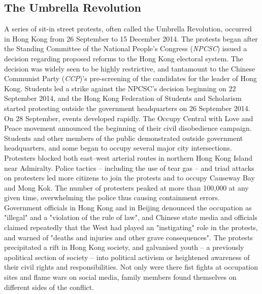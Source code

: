 \documentclass[10pt,conference,a4paper]{IEEEtran}%
\begin{document}
\subsection{The Umbrella Revolution}
A series of sit-in street protests, often called the Umbrella Revolution, occurred in Hong Kong from 26 September to 15 December 2014. The protests began after the Standing Committee of the National People's Congress (\emph{NPCSC}) issued a decision regarding proposed reforms to the Hong Kong electoral system. The decision was widely seen to be highly restrictive, and tantamount to the Chinese Communist Party (\emph{CCP})'s pre-screening of the candidates for the leader of Hong Kong.
Students led a strike against the NPCSC's decision beginning on 22 September 2014, and the Hong Kong Federation of Students and Scholarism started protesting outside the government headquarters on 26 September 2014. On 28 September, events developed rapidly. The Occupy Central with Love and Peace movement announced the beginning of their civil disobedience campaign. Students and other members of the public demonstrated outside government headquarters, and some began to occupy several major city intersections. Protesters blocked both east–west arterial routes in northern Hong Kong Island near Admiralty. Police tactics – including the use of tear gas – and triad attacks on protesters led more citizens to join the protests and to occupy Causeway Bay and Mong Kok. The number of protesters peaked at more than 100,000 at any given time, overwhelming the police thus causing containment errors.
Government officials in Hong Kong and in Beijing denounced the occupation as "illegal" and a "violation of the rule of law", and Chinese state media and officials claimed repeatedly that the West had played an "instigating" role in the protests, and warned of "deaths and injuries and other grave consequences". The protests precipitated a rift in Hong Kong society, and galvanised youth – a previously apolitical section of society – into political activism or heightened awareness of their civil rights and responsibilities. Not only were there fist fights at occupation sites and flame wars on social media, family members found themselves on different sides of the conflict.
\end{document}
